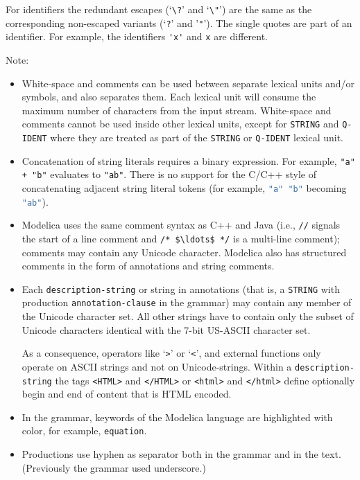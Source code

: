 For identifiers the redundant escapes (`\lstinline!\?!' and `\lstinline!\"!') are the same as the corresponding non-escaped variants (`\lstinline!?!' and '\lstinline!"!').
The single quotes are part of an identifier.
For example, the identifiers \lstinline!'x'! and \lstinline!x! are different.

Note:
\begin{itemize}
\item
  White-space and comments can be used between separate lexical units and/or symbols, and also separates them. Each lexical unit will consume the maximum number of characters from the input stream.
  White-space and comments cannot be used inside other lexical units, except for \lstinline[language=grammar]!STRING! and \lstinline[language=grammar]!Q-IDENT! where they are treated as part of the \lstinline[language=grammar]!STRING! or \lstinline[language=grammar]!Q-IDENT! lexical unit.
\item
  Concatenation of string literals requires a binary expression.
  For example, \lstinline!"a" + "b"! evaluates to \lstinline!"ab"!.
  There is no support for the C/C++ style of concatenating adjacent string literal tokens (for example, \lstinline[language=C]!"a" "b"! becoming \lstinline[language=C]!"ab"!).
\item
  Modelica uses the same comment syntax as C++ and Java (i.e., \lstinline!//! signals the start of a line comment and \lstinline!/* $\ldots$ */! is a multi-line comment); comments may contain any Unicode character.
  Modelica also has structured comments in the form of annotations and string comments.
\item
  Each \lstinline[language=grammar]!description-string! or string in annotations (that is, a \lstinline[language=grammar]!STRING! with production \lstinline[language=grammar]!annotation-clause! in the grammar) may contain any member of the Unicode character set.
  All other strings have to contain only the subset of Unicode characters identical with the 7-bit US-ASCII character set.
  \begin{nonnormative}
  As a consequence, operators like `\lstinline!>!' or `\lstinline!<!', and external functions only operate on ASCII strings and not on Unicode-strings.
  Within a \lstinline[language=grammar]!description-string! the tags \lstinline!<HTML>! and \lstinline!</HTML>! or \lstinline!<html>! and \lstinline!</html>! define optionally begin and end of content that is HTML encoded.
  \end{nonnormative}
\item
  In the grammar, keywords of the Modelica language are highlighted with color, for example, \lstinline[language=grammar]!equation!.
\item
  Productions use hyphen as separator both in the grammar and in the text.
  (Previously the grammar used underscore.)
\end{itemize}

